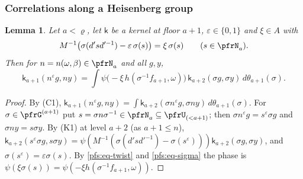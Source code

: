 \documentclass[10pt]{amsart}
\newtheorem{lemma}[theorem]{Lemma}
\theoremstyle{definition}
\theoremstyle{remark}
\begin{document}
\subsubsection*{Correlations along a Heisenberg group}
\begin{lemma}\label{pfs:heiscorr}
Let $a<\varrho$, let $\mathsf k$ be a kernel at floor $a+1$, $\varepsilon\in\{0,1\}$ and $\xi\in A$ with
\begin{equation}\label{pfs:eq-twist}
M^{-1}\bigl(\sigma(d'sd'^{-1})-\varepsilon\,\sigma(s)\bigr)=\xi\,\sigma(s)\qquad(s\in\pfrN_a).
\end{equation}
Then for $n=n(\omega,\beta)\in\pfrN_a$ and all $g,y$,
\[
\mathsf k_{a+1}(n^\varepsilon g,ny)=\int\psi\bigl(-\xi\,h(\sigma^{-1}f_{a+1},\omega)\bigr)\,\mathsf k_{a+2}(\sigma g,\sigma y)\,d\theta_{a+1}(\sigma).
\]
\end{lemma}
\begin{proof}
By (C1), $\mathsf k_{a+1}(n^\varepsilon g,ny)=\int\mathsf k_{a+2}(\sigma n^\varepsilon g,\sigma ny)\,d\theta_{a+1}(\sigma)$. For
$\sigma\in\pfrG^{(a+1)}$ put $s=\sigma n\sigma^{-1}\in\pfrN_a\subseteq\pfrU_{(<a+1)}$; then $\sigma n^\varepsilon g=s^\varepsilon\sigma g$
and $\sigma ny=s\sigma y$. By (K1) at level $a+2$ (as $a+1\le n$),
$\mathsf k_{a+2}(s^\varepsilon\sigma g,s\sigma y)=\psi(M^{-1}(\sigma(d'sd'^{-1})-\sigma(s^\varepsilon)))\mathsf k_{a+2}(\sigma g,\sigma y)$, and
$\sigma(s^\varepsilon)=\varepsilon\sigma(s)$. By \eqref{pfs:eq-twist} and \eqref{pfs:eq-sigma} the phase is
$\psi(\xi\sigma(s))=\psi(-\xi h(\sigma^{-1}f_{a+1},\omega))$.
\end{proof}
\end{document}
